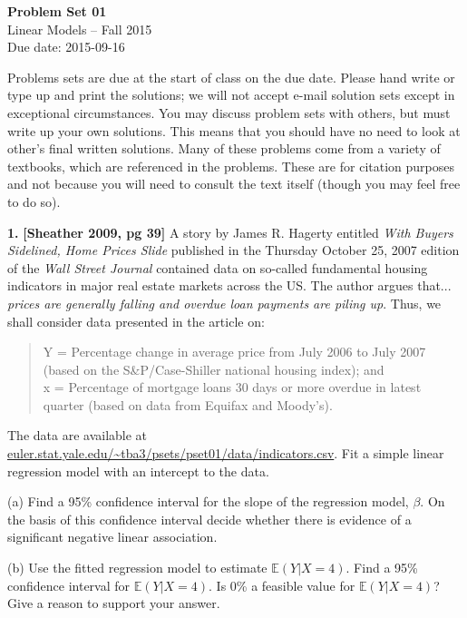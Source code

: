 \documentclass[12pt]{article}
\begin{document}
\begin{center}
{\bf Problem Set 01} \\
Linear Models -- Fall 2015 \\
Due date: 2015-09-16
\end{center}

\medskip

Problems sets are due at the start of class on the due date. Please hand write
or type up and print the solutions; we will not accept e-mail solution sets except
in exceptional circumstances. You may discuss problem sets with others, but must
write up your own solutions. This means that you should have no need to look at other's
final written solutions. Many of these problems come from a variety of textbooks,
which are referenced in the problems. These are for citation purposes and not because
you will need to consult the text itself (though you may feel free to do so).

\medskip

{\bf 1.} {\bf [Sheather 2009, pg 39]} A story by James R. Hagerty entitled {\it With Buyers Sidelined, Home Prices Slide} published in the Thursday October 25, 2007 edition of the {\it Wall Street Journal} contained data on so-called fundamental housing indicators in major real estate markets across the US. The author argues that... {\it prices are generally falling and overdue loan payments are piling up}. Thus, we shall consider data presented in the article on:

\begin{quote}
Y = Percentage change in average price from July 2006 to July 2007 (based on the S\&P/Case-Shiller national housing index); and \\
x = Percentage of mortgage loans 30 days or more overdue in latest quarter (based on data from Equifax and Moody’s).
\end{quote}

The data are available at \url{euler.stat.yale.edu/~tba3/psets/pset01/data/indicators.csv}. Fit a simple linear regression model with an intercept to the data.

(a) Find a 95\% confidence interval for the slope of the regression model, $\beta$. On the basis of this confidence interval decide whether there is evidence of a significant negative linear association.

(b) Use the fitted regression model to estimate $\mathbb{E}(Y | X=4)$. Find a 95\% confidence interval for $\mathbb{E}(Y | X=4)$. Is 0\% a feasible value for $\mathbb{E}(Y | X=4)$? Give a reason to support your answer.
\end{document}
